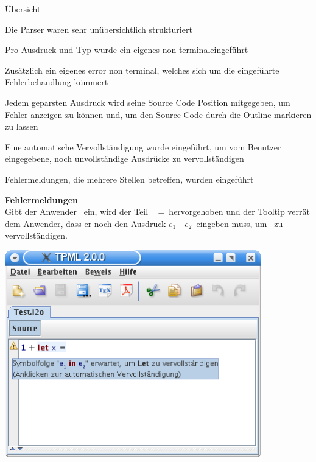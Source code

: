 {
  \begin{itemgroup}{Übersicht}
    \item Die Parser waren sehr unübersichtlich strukturiert
    \item Pro Ausdruck und Typ wurde ein eigenes \glqq non terminal\grqq eingeführt
    \item Zusätzlich ein eigenes \glqq error non terminal\grqq, welches sich um
          die eingeführte Fehlerbehandlung kümmert
    \item Jedem geparsten Ausdruck wird seine Source Code Position mitgegeben, um
          Fehler anzeigen zu können und, um den Source Code durch die Outline
          markieren zu lassen
    \item Eine automatische Vervollständigung wurde eingeführt, um vom Benutzer
          eingegebene, noch unvollständige Ausdrücke zu vervollständigen
    \item Fehlermeldungen, die mehrere Stellen betreffen, wurden eingeführt
  \end{itemgroup}
}

{
  {\bf Fehlermeldungen}\\[2mm]
  Gibt der Anwender \glqq {}\grqq\ 
  ein, wird der Teil \glqq \KeyLet\  =\grqq\ hervorgehoben und der Tooltip
  verrät dem Anwender, dass er noch den Ausdruck \glqq $e_1$\ \KeyIn\ $e_2$\grqq\ eingeben muss,
  um \glqq{\bf Let}\grqq\ zu vervollständigen.
  \begin{center}
    \includegraphics[height=9cm]{images/parser.png}
  \end{center}
}